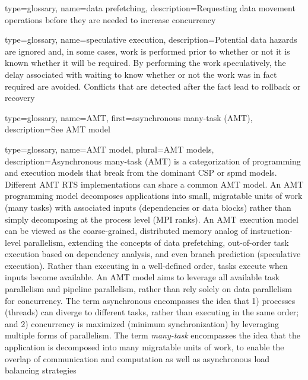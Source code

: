 {
  type=glossary,
  name={data prefetching},
  description={Requesting data movement operations before they are needed to
    increase \gls{concurrency}}
}

{
  type=glossary,
  name={speculative execution},
  description={Potential data hazards are ignored and, in some cases, work is performed prior to
    whether or not it is known whether it will be required.  By performing the
      work speculatively, the delay associated with waiting to know whether or not the work
      was in fact required are avoided. Conflicts that are detected after the
      fact lead to rollback or recovery}
}

{
  type=glossary,
  name={AMT},
  first={asynchronous many-task (AMT)},
  description={See \gls{AMT model}}
}

{
  type=glossary,
  name={AMT model},
  plural={AMT models},
  description={Asynchronous many-task (AMT) is a categorization of programming
    and \glspl{execution model} that break from the dominant \gls{CSP} or \gls{spmd} models.
      Different \gls{AMT RTS} implementations can share a common AMT model.
	An AMT \gls{programming model} decomposes applications into small,
  \gls{migratable} units of work (many tasks) with associated inputs (dependencies or data blocks) rather than simply decomposing at the process level (\gls{MPI} ranks).
	An AMT \gls{execution model} can be viewed as the coarse-grained, distributed memory analog of instruction-level parallelism, extending the concepts of data prefetching,
	out-of-order task execution based on dependency analysis, and even branch
    prediction (\gls{speculative execution}). 
	Rather than executing in a well-defined order, tasks execute when inputs become available.
	An AMT model aims to leverage all available \gls{task parallelism} and
  \gls{pipeline parallelism},
  rather than rely solely on \gls{data parallelism} for \gls{concurrency}.
	The term asynchronous encompasses the idea that 1) processes (threads) can
  diverge to different tasks, rather than executing in the same order; and 2)
  \gls{concurrency} is maximized (minimum synchronization) by leveraging multiple forms of parallelism.
	The term {\em many-task} encompasses the idea that the application is
  decomposed into many \gls{migratable} units of work, to enable the overlap of
  communication and computation as well as \gls{asynchronous} load balancing strategies}
}



